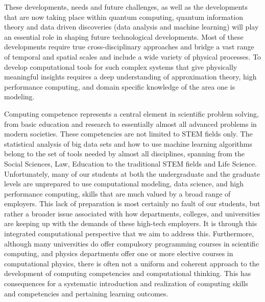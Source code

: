 \documentclass[graybox,envcountchap,sectrefs]{svmult}
\begin{document}
These developments, needs and future challenges, as well as the
developments that are now taking place within quantum computing,
quantum information theory and data driven discoveries (data analysis and
machine learning) will play an essential role in shaping future
technological developments. Most of these developments require true
cross-disciplinary approaches and bridge a vast range of
temporal and spatial scales and include a wide variety of physical
processes. To develop computational tools for such complex
systems that give physically meaningful insights requires a deep
understanding of approximation theory, high performance computing, and
domain specific knowledge of the area one is modeling.

Computing competence represents a central element in scientific
problem solving, from basic education and research to essentially
almost all advanced problems in modern societies. These
competencies are not limited to STEM fields only. The statistical
analysis of big data sets and how to use machine learning algorithms
belong to the set of tools needed by almost all disciplines,
spanning from the Social Sciences, Law, Education to the traditional
STEM fields and Life Science.  Unfortunately, many of our students at
both the undergraduate and the graduate levels are unprepared to use
computational modeling, data science, and high performance computing,
skills that are much valued by a broad range of employers. This lack of preparation is most certainly no fault of our students, but rather a broader issue associated with how departments, colleges, and universities are keeping up with the demands of these high-tech employers. It is through this integrated computational perspective that we aim to address this.
Furthermore, although many universities do offer compulsory
programming courses in scientific computing, and physics departments
offer one or more elective courses in computational physics, there is
often not a uniform and coherent approach to the development of
computing  competencies and computational thinking. This has
consequences for a systematic introduction and realization of
computing  skills and competencies and pertaining learning outcomes.
\end{document}
